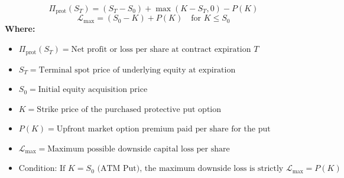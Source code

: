 \begin{formulabox}
\begin{equation*}
\Pi_{\text{prot}}(S_T) = (S_T - S_0) + \max(K - S_T, 0) - P(K)
\end{equation*}
\begin{equation*}
\mathcal{L}_{\max} = (S_0 - K) + P(K) \quad \text{for } K \le S_0
\end{equation*}
\textbf{Where:}
\begin{itemize}[leftmargin=1.8em, noitemsep]
    \item $\Pi_{\text{prot}}(S_T) = \text{Net profit or loss per share at contract expiration } T$
    \item $S_T = \text{Terminal spot price of underlying equity at expiration}$
    \item $S_0 = \text{Initial equity acquisition price}$
    \item $K = \text{Strike price of the purchased protective put option}$
    \item $P(K) = \text{Upfront market option premium paid per share for the put}$
    \item $\mathcal{L}_{\max} = \text{Maximum possible downside capital loss per share}$
    \item $\text{Condition: If } K = S_0 \text{ (ATM Put), the maximum downside loss is strictly } \mathcal{L}_{\max} = P(K)$
\end{itemize}
\end{formulabox}

